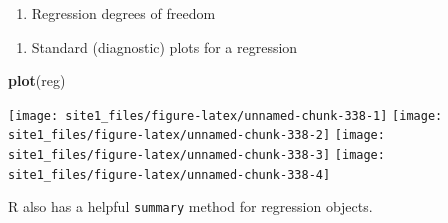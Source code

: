 \documentclass[]{book}
\newenvironment{Shaded}{\begin{snugshade}}{\end{snugshade}}
\newcommand{\CommentTok}[1]{\textcolor[rgb]{0.56,0.35,0.01}{\textit{#1}}}
\newcommand{\KeywordTok}[1]{\textcolor[rgb]{0.13,0.29,0.53}{\textbf{#1}}}
\newcommand{\NormalTok}[1]{#1}
\newcommand{\OperatorTok}[1]{\textcolor[rgb]{0.81,0.36,0.00}{\textbf{#1}}}
\providecommand{\tightlist}{%
  \setlength{\itemsep}{0pt}\setlength{\parskip}{0pt}}
\begin{document}
\begin{enumerate}
\def\labelenumi{\arabic{enumi}.}
\setcounter{enumi}{2}
\tightlist
\item
  Regression degrees of freedom
\end{enumerate}

\begin{Shaded}
\end{Shaded}

\begin{enumerate}
\def\labelenumi{\arabic{enumi}.}
\setcounter{enumi}{3}
\tightlist
\item
  Standard (diagnostic) plots for a regression
\end{enumerate}

\begin{Shaded}
\begin{Highlighting}[]
\KeywordTok{plot}\NormalTok{(reg)}
\end{Highlighting}
\end{Shaded}

\begin{center}\texttt{[image: site1\_files/figure-latex/unnamed-chunk-338-1]} \texttt{[image: site1\_files/figure-latex/unnamed-chunk-338-2]} \texttt{[image: site1\_files/figure-latex/unnamed-chunk-338-3]} \texttt{[image: site1\_files/figure-latex/unnamed-chunk-338-4]} \end{center}

R also has a helpful \texttt{summary} method for regression objects.
\end{document}
